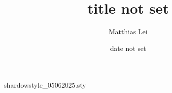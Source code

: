 \begin{filecontents*}{shardowstyle_05062025.sty}
\newcommand{\colouredunderline}[3]{\textcolor{#2}{\uline{\textcolor{#1}{#3}}}}
\newcommand{\reference}[2]{\colouredunderline{blue}{teal}{\href{#1}{#2}}}


\newcommand{\indicator}[2][\phantom{}]{\mathbb{I}_{#1}(#2)}
\newcommand{\transpose}{\top}




\newif\ifhidetemptext
\newcommand{\temptext}[1]{%
    \ifhidetemptext
    \else
        \textcolor{gray}{\textsl{#1}}%
    \fi
}


\title{title not set}
\author{Matthias Lei}
\date{date not set}
\end{filecontents*}


\documentclass[oneside, 12pt, english]{article}

\usepackage{amsmath}
\usepackage{amsfonts}
\usepackage{mathtools}

\usepackage{amssymb}
\usepackage{amsthm}

\usepackage[framemethod=tikz]{mdframed}
\usepackage{wrapfig}

\usepackage{geometry}
\usepackage{parskip}


\usepackage{XCharter}

\usepackage{enumerate}
\usepackage{booktabs}
\usepackage{hyperref}

\usepackage[
    spacing=on, 
]{microtype}

\renewcommand{\familydefault}{pplj}

\setlength{\parskip}{1.2ex plus 0.2ex minus 0.2ex}


\usepackage{geometry}


\usepackage{centernot}


\usepackage{shardowstyle_05062025}


\usepackage{fancyhdr}


\makeatletter
\newsavebox{\blobstarbox}
\newcommand{\blobstar}{\mathpalette\blobstardraw{}}
\newcommand{\blobstardraw}[2]{%
    \sbox\blobstarbox{$#1\mathrm{x}$}%
    \tikz[baseline=-0.5\ht\blobstarbox, x=\ht\blobstarbox, y=\ht\blobstarbox]{%
        \fill (0, 1) .. controls (0.15, 0.15) .. (1.25, 0)
            .. controls (0.15, -0.15) .. (0, -1)
            .. controls (-0.15, -0.15) .. (-1, 0)
            .. controls (-0.15, 0.15) .. cycle;%
    }%
}
\makeatother

